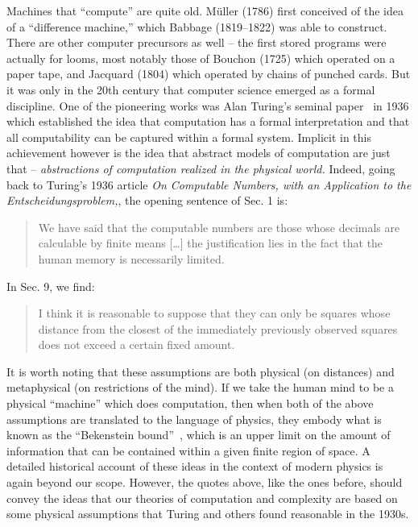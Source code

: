 \documentclass{article}
\begin{document}
Machines that ``compute'' are quite old. M\"{u}ller (1786) first
conceived of the idea of a ``difference machine,'' which Babbage
(1819--1822) was able to construct. There are other computer
precursors as well -- the first stored programs were actually for
looms, most notably those of Bouchon (1725) which operated on a paper
tape, and Jacquard (1804) which operated by chains of punched cards.
But it was only in the 20th century that computer science emerged as a
formal discipline. One of the pioneering works was Alan Turing's
seminal paper~\cite{turing} in 1936 which established the idea that
computation has a formal interpretation and that all computability can
be captured within a formal system. Implicit in this achievement
however is the idea that abstract models of computation are just that
-- \emph{abstractions of computation realized in the physical world.}
Indeed, going back to Turing's 1936 article \emph{On Computable
  Numbers, with an Application to the Entscheidungsproblem,}, the
opening sentence of Sec. 1 is:
\begin{quote}
  We have said that the computable numbers are those whose decimals
  are calculable by finite means [\ldots] the justification lies in
  the fact that the human memory is necessarily limited.
\end{quote}
In Sec. 9, we find:
\begin{quote}
  I think it is reasonable to suppose that they can only be squares
  whose distance from the closest of the immediately previously
  observed squares does not exceed a certain fixed amount.
\end{quote}
It is worth noting that these assumptions are both physical (on
distances) and metaphysical (on restrictions of the mind).  If we take
the human mind to be a physical ``machine'' which does computation,
then when both of the above assumptions are translated to the language
of physics, they embody what is known as the ``Bekenstein
bound''~\cite{PhysRevD.23.287}, which is an upper limit on the amount
of information that can be contained within a given finite region of
space. A detailed historical account of these ideas in the context of
modern physics is again beyond our scope. However, the quotes above,
like the ones before, should convey the ideas that our theories of
computation and complexity are based on some physical assumptions that
Turing and others found reasonable in the 1930s.
\end{document}
